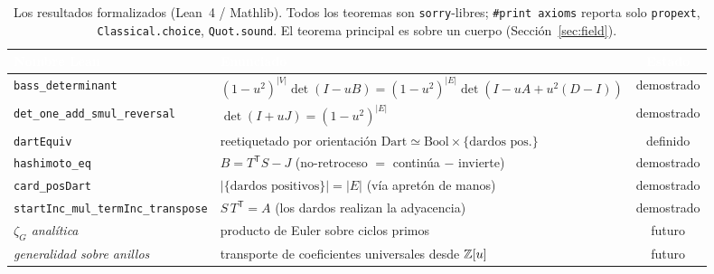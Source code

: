
\begin{table}[t]
  \centering
  \small
  \caption{Los resultados formalizados (Lean~4 / Mathlib). Todos los teoremas son
  \texttt{sorry}-libres; \texttt{\#print axioms} reporta solo \texttt{propext},
  \texttt{Classical.choice}, \texttt{Quot.sound}. El teorema principal es sobre un cuerpo
  (Secci\'on~\ref{sec:field}).}
  \label{tab:bass_results}
  \begin{tabular}{@{}llc@{}}
    \toprule
    \rowcolor{ggteal}
    \textcolor{white}{\textbf{Nombre Lean}} & \textcolor{white}{\textbf{Enunciado}} & \textcolor{white}{\textbf{Estado}} \\
    \midrule
    \rowcolor{ggband}
    \texttt{bass\_determinant} & $(1{-}u^2)^{|V|}\det(I{-}uB)=(1{-}u^2)^{|E|}\det(I{-}uA{+}u^2(D{-}I))$ & demostrado \\
    \texttt{det\_one\_add\_smul\_reversal} & $\det(I+uJ)=(1-u^2)^{|E|}$ & demostrado \\
    \rowcolor{ggband}
    \texttt{dartEquiv} & reetiquetado por orientaci\'on $\mathrm{Dart}\simeq\mathrm{Bool}\times\{\text{dardos pos.}\}$ & definido \\
    \texttt{hashimoto\_eq} & $B=T^{\mathsf T}S-J$ (no-retroceso $=$ contin\'ua $-$ invierte) & demostrado \\
    \rowcolor{ggband}
    \texttt{card\_posDart} & $|\{\text{dardos positivos}\}|=|E|$ (v\'ia apret\'on de manos) & demostrado \\
    \texttt{startInc\_mul\_termInc\_transpose} & $S\,T^{\mathsf T}=A$ (los dardos realizan la adyacencia) & demostrado \\
    \midrule
    \emph{$\zeta_G$ anal\'itica} & producto de Euler sobre ciclos primos & futuro \\
    \rowcolor{ggband}
    \emph{generalidad sobre anillos} & transporte de coeficientes universales desde $\mathbb{Z}[u]$ & futuro \\
    \bottomrule
  \end{tabular}
\end{table}

